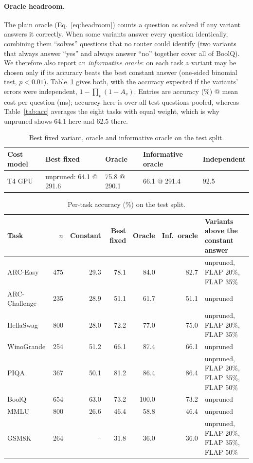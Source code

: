 \paragraph{Oracle headroom.} The plain oracle (Eq.~\eqref{eq:headroom}) counts a question as solved if any variant answers it correctly. When some variants answer every question identically, combining them ``solves'' questions that no router could identify (two variants that always answer ``yes'' and always answer ``no'' together cover all of BoolQ). We therefore also report an \emph{informative oracle}: on each task a variant may be chosen only if its accuracy beats the best constant answer (one-sided binomial test, $p<0.01$). Table~\ref{tab:headroom} gives both, with the accuracy expected if the variants' errors were independent, $1-\prod_v(1-A_v)$. Entries are accuracy (\%) @ mean cost per question (ms); accuracy here is over all test questions pooled, whereas Table~\ref{tab:acc} averages the eight tasks with equal weight, which is why unpruned shows 64.1 here and 62.5 there.

\begin{table}[!htbp]\centering\small
\begin{tabular}{lllll}
\toprule
Cost model & Best fixed & Oracle & Informative oracle & Independent \\
\midrule
T4 GPU & unpruned: 64.1 @ 291.6 & 75.8 @ 290.1 & 66.1 @ 291.4 & 92.5 \\
\bottomrule
\end{tabular}
\caption{Best fixed variant, oracle and informative oracle on the test split.}\label{tab:headroom}
\end{table}

\begin{table}[!htbp]\centering\small
\begin{tabularx}{\linewidth}{lrrrrrX}
\toprule
Task & $n$ & Constant & Best fixed & Oracle & Inf.\ oracle & Variants above the constant answer \\
\midrule
ARC-Easy & 475 & 29.3 & 78.1 & 84.0 & 82.7 & unpruned, FLAP 20\%, FLAP 35\% \\
ARC-Challenge & 235 & 28.9 & 51.1 & 61.7 & 51.1 & unpruned \\
HellaSwag & 800 & 28.0 & 72.2 & 77.0 & 75.0 & unpruned, FLAP 20\%, FLAP 35\% \\
WinoGrande & 254 & 51.2 & 66.1 & 87.4 & 66.1 & unpruned \\
PIQA & 367 & 50.1 & 81.2 & 86.4 & 86.4 & unpruned, FLAP 20\%, FLAP 35\%, FLAP 50\% \\
BoolQ & 654 & 63.0 & 73.2 & 100.0 & 73.2 & unpruned \\
MMLU & 800 & 26.6 & 46.4 & 58.8 & 46.4 & unpruned \\
GSM8K & 264 & -- & 31.8 & 36.0 & 36.0 & unpruned, FLAP 20\%, FLAP 35\%, FLAP 50\% \\
\bottomrule
\end{tabularx}
\caption{Per-task accuracy (\%) on the test split.}\label{tab:pertask}
\end{table}

